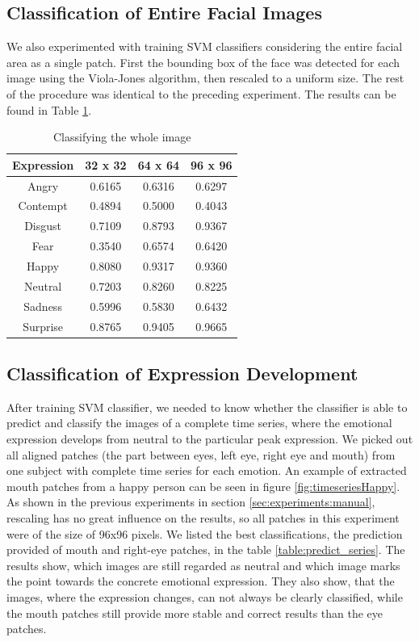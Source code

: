 \subsection{Classification of Entire Facial Images}
We also experimented with training SVM classifiers considering the entire facial area as a single patch. First the bounding box of the face was detected
for each image using the Viola-Jones algorithm, then rescaled to a uniform size. %
The rest of the procedure was identical to the preceding experiment. The results can be found in Table \ref{table:entire_images}.

\begin{table}
\begin{tabular}{| c | c | c | c |}
\hline
Expression & 32 x 32 &  64 x 64  & 96 x 96  \\

\hline
Angry	 & 0.6165 & 0.6316 & 0.6297	\\
Contempt & 0.4894 & 0.5000 & 0.4043	\\
Disgust	 & 0.7109 & 0.8793 & 0.9367	\\
Fear	 & 0.3540 & 0.6574 & 0.6420	\\
Happy	 & 0.8080 & 0.9317 & 0.9360	\\
Neutral	 & 0.7203 & 0.8260 & 0.8225	\\
Sadness	 & 0.5996 & 0.5830 & 0.6432	\\
Surprise & 0.8765 & 0.9405 & 0.9665	\\

\hline
\end{tabular}
\caption{Classifying the whole image}
\label{table:entire_images}
\end{table}


\subsection{Classification of Expression Development}
After training SVM classifier, we needed to know whether the classifier is able to predict and classify the images of a complete time series, where the emotional expression develops from neutral to the particular peak expression. We picked out all aligned patches (the part between eyes, left eye, right eye and mouth) from one subject with complete time series for each emotion. An example of extracted mouth patches from a happy person can be seen in figure \ref{fig:timeseriesHappy}. As shown in the previous experiments in section \ref{sec:experiments:manual}, rescaling has no great influence on the results, so all patches in this experiment were of the size of 96x96 pixels. We listed the best classifications, the prediction provided of mouth and right-eye patches, in the table \ref{table:predict_series}. The results show, which images are still regarded as neutral and which image marks the point towards the concrete emotional expression. They also show, that the images, where the expression changes, can not always be clearly classified, while the mouth patches still provide more stable and correct results than the eye patches.

